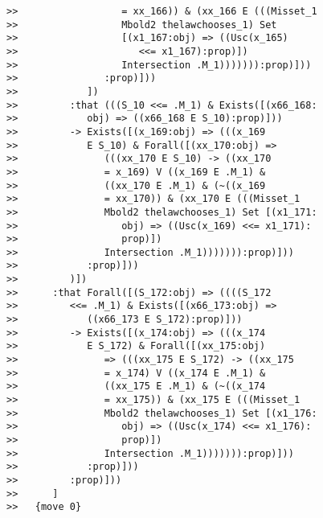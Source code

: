 \documentclass[12pt]{article}
\begin{document}
\begin{verbatim}
>>                  = xx_166)) & (xx_166 E (((Misset_1
>>                  Mbold2 thelawchooses_1) Set
>>                  [(x1_167:obj) => ((Usc(x_165)
>>                     <<= x1_167):prop)])
>>                  Intersection .M_1))))))):prop)]))
>>               :prop)]))
>>            ])
>>         :that (((S_10 <<= .M_1) & Exists([(x66_168:
>>            obj) => ((x66_168 E S_10):prop)]))
>>         -> Exists([(x_169:obj) => (((x_169
>>            E S_10) & Forall([(xx_170:obj) =>
>>               (((xx_170 E S_10) -> ((xx_170
>>               = x_169) V ((x_169 E .M_1) &
>>               ((xx_170 E .M_1) & (~((x_169
>>               = xx_170)) & (xx_170 E (((Misset_1
>>               Mbold2 thelawchooses_1) Set [(x1_171:
>>                  obj) => ((Usc(x_169) <<= x1_171):
>>                  prop)])
>>               Intersection .M_1))))))):prop)]))
>>            :prop)]))
>>         )])
>>      :that Forall([(S_172:obj) => ((((S_172
>>         <<= .M_1) & Exists([(x66_173:obj) =>
>>            ((x66_173 E S_172):prop)]))
>>         -> Exists([(x_174:obj) => (((x_174
>>            E S_172) & Forall([(xx_175:obj)
>>               => (((xx_175 E S_172) -> ((xx_175
>>               = x_174) V ((x_174 E .M_1) &
>>               ((xx_175 E .M_1) & (~((x_174
>>               = xx_175)) & (xx_175 E (((Misset_1
>>               Mbold2 thelawchooses_1) Set [(x1_176:
>>                  obj) => ((Usc(x_174) <<= x1_176):
>>                  prop)])
>>               Intersection .M_1))))))):prop)]))
>>            :prop)]))
>>         :prop)]))
>>      ]
>>   {move 0}


\end{verbatim}
\end{document}
